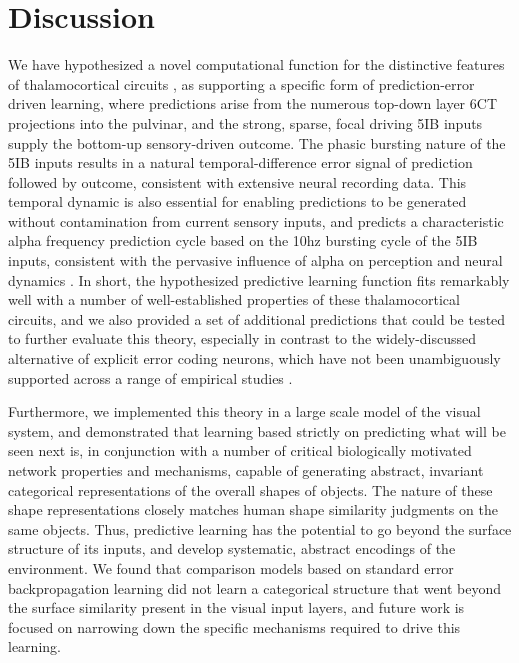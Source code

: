 \documentclass[11pt,twoside]{article}
\newif\myifpdf
\begin{document}
\section{Discussion}

We have hypothesized a novel computational function for the distinctive features of thalamocortical circuits \citep{ShermanGuillery06,UsreySherman18}, as supporting a specific form of prediction-error driven learning, where predictions arise from the numerous top-down layer 6CT projections into the pulvinar, and the strong, sparse, focal driving 5IB inputs supply the bottom-up sensory-driven outcome. The phasic bursting nature of the 5IB inputs results in a natural temporal-difference error signal of prediction followed by outcome, consistent with extensive neural recording data.  This temporal dynamic is also essential for enabling predictions to be generated without contamination from current sensory inputs, and predicts a characteristic alpha frequency prediction cycle based on the 10hz bursting cycle of the 5IB inputs, consistent with the pervasive influence of alpha on perception and neural dynamics \citep{JensenBonnefondMarshallEtAl15,VanRullen16,ClaytonYeungKadosh18,FosterAwh19}.  In short, the hypothesized predictive learning function fits remarkably well with a number of well-established properties of these thalamocortical circuits, and we also provided a set of additional predictions that could be tested to further evaluate this theory, especially in contrast to the widely-discussed alternative of explicit error coding neurons, which have not been unambiguously supported across a range of empirical studies \citep{WalshMcGovernClarkEtAl20}.

Furthermore, we implemented this theory in a large scale model of the visual system, and demonstrated that learning based strictly on predicting what will be seen next is, in conjunction with a number of critical biologically motivated network properties and mechanisms, capable of generating abstract, invariant categorical representations of the overall shapes of objects.  The nature of these shape representations closely matches human shape similarity judgments on the same objects.  Thus, predictive learning has the potential to go beyond the surface structure of its inputs, and develop systematic, abstract encodings of the environment.   We found that comparison models based on standard error backpropagation learning did not learn a categorical structure that went beyond the surface similarity present in the visual input layers, and future work is focused on narrowing down the specific mechanisms required to drive this learning.
\end{document}
